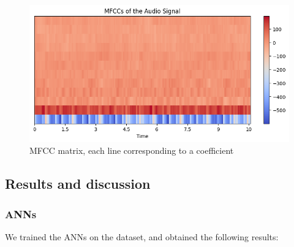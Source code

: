 \documentclass[11pt]{article}
\begin{document}
\begin{figure}[H]
  \begin{center}
    \includegraphics[width=\textwidth]{image/guitar_mfcc.png}
    \caption{MFCC matrix, each line corresponding to a coefficient}
    \label{fig:guitar_mfcc}
  \end{center}
\end{figure}




\subsection{Results and discussion}

\subsubsection*{ANNs}

We trained the ANNs on the dataset, and obtained the following results:
\end{document}
